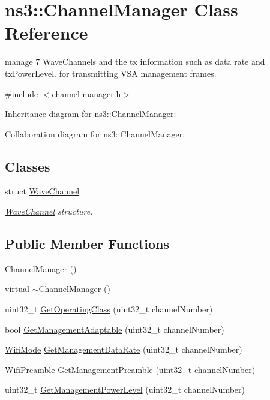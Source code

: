 \hypertarget{classns3_1_1ChannelManager}{}\section{ns3\+:\+:Channel\+Manager Class Reference}
\label{classns3_1_1ChannelManager}


manage 7 Wave\+Channels and the tx information such as data rate and tx\+Power\+Level. for transmitting V\+SA management frames.  




{\ttfamily \#include $<$channel-\/manager.\+h$>$}



Inheritance diagram for ns3\+:\+:Channel\+Manager\+:


Collaboration diagram for ns3\+:\+:Channel\+Manager\+:
\subsection*{Classes}
\begin{DoxyCompactItemize}
\item 
struct \hyperlink{structns3_1_1ChannelManager_1_1WaveChannel}{Wave\+Channel}
\begin{DoxyCompactList}\small\item\em \hyperlink{structns3_1_1ChannelManager_1_1WaveChannel}{Wave\+Channel} structure. \end{DoxyCompactList}\end{DoxyCompactItemize}
\subsection*{Public Member Functions}
\begin{DoxyCompactItemize}
\item 
\hyperlink{classns3_1_1ChannelManager_a261e6584548a2177e3c2e96f1aeb53c7}{Channel\+Manager} ()
\item 
virtual \hyperlink{classns3_1_1ChannelManager_a60ea889271c320e7db1a2fd5a8f8cea8}{$\sim$\+Channel\+Manager} ()
\item 
uint32\+\_\+t \hyperlink{classns3_1_1ChannelManager_ab27167f732d98bfab808c4aa5b48d684}{Get\+Operating\+Class} (uint32\+\_\+t channel\+Number)
\item 
bool \hyperlink{classns3_1_1ChannelManager_a467163c8117c31d3860af09728a4afbc}{Get\+Management\+Adaptable} (uint32\+\_\+t channel\+Number)
\item 
\hyperlink{classns3_1_1WifiMode}{Wifi\+Mode} \hyperlink{classns3_1_1ChannelManager_a9942597ae7830c85b0474ae46e536fbc}{Get\+Management\+Data\+Rate} (uint32\+\_\+t channel\+Number)
\item 
\hyperlink{group__wifi_ga5e94a56cb338a14ffbbb19c6a41251eb}{Wifi\+Preamble} \hyperlink{classns3_1_1ChannelManager_a7c14a67e13e5dfe34beef2bb73a9f0b2}{Get\+Management\+Preamble} (uint32\+\_\+t channel\+Number)
\item 
uint32\+\_\+t \hyperlink{classns3_1_1ChannelManager_a9197916f250106b0dae125d151441762}{Get\+Management\+Power\+Level} (uint32\+\_\+t channel\+Number)
\end{DoxyCompactItemize}
